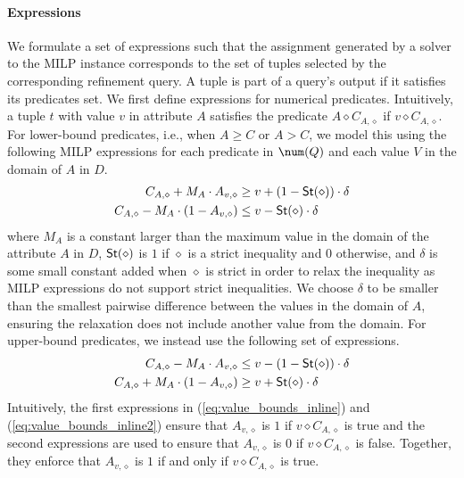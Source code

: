 \paragraph*{Expressions}  We formulate a set of expressions such that the assignment generated by a solver to the MILP instance corresponds to the set of tuples selected by the corresponding refinement query. A tuple is part of a query's output if it satisfies its predicates set. We first define expressions for numerical predicates. Intuitively, a tuple $t$ with value $v$ in attribute $A$ satisfies the predicate $A \diamond C_{A, \diamond}$ if $v \diamond C_{A, \diamond}$. For lower-bound predicates, i.e., when $A \geq C$ or $A > C$, we model this using the following MILP expressions for each predicate in $\num(Q)$ and each value $V$ in the domain of $A$ in $D$.%
\begin{align}
\begin{split}
C_{A, \diamond} + M_A \cdot A_{v, \diamond} &\geq v + (1 - {\sf St}(\diamond)) \cdot \delta \label{eq:value_bounds_inline}\\
C_{A, \diamond} - M_A \cdot (1 - A_{v, \diamond}) &\leq v - {\sf St}(\diamond) \cdot \delta
\end{split}
\end{align} 
where $M_A$ is a constant larger than the maximum  value in the domain of the attribute $A$ in $D$, ${\sf St}(\diamond)$ is $1$ if $\diamond$ is a strict inequality and $0$ otherwise, and $\delta$ is some small constant added when $\diamond$ is strict in order to relax the inequality as MILP expressions do not support strict inequalities. We choose $\delta$ to be smaller than the smallest pairwise difference between the values in the domain of $A$, ensuring the relaxation does not include another value from the domain. For upper-bound predicates, we instead use the following set of expressions.
\begin{align}
\begin{split}
C_{A, \diamond} - M_A \cdot A_{v, \diamond} &\leq v - (1 - {\sf St}(\diamond)) \cdot \delta \label{eq:value_bounds_inline2}\\
C_{A, \diamond} + M_A \cdot (1 - A_{v, \diamond}) &\geq v + {\sf St}(\diamond) \cdot \delta
\end{split}
\end{align}
 Intuitively, the first expressions in (\ref{eq:value_bounds_inline}) and (\ref{eq:value_bounds_inline2}) ensure that $A_{v, \diamond}$ is $1$ if $v \diamond C_{A, \diamond}$ is true and the second expressions are used to ensure that $A_{v, \diamond}$ is 0 if $v \diamond C_{A, \diamond}$ is false. Together, they enforce that $A_{v, \diamond}$ is $1$ if and only if $v \diamond C_{A, \diamond}$ is true.
